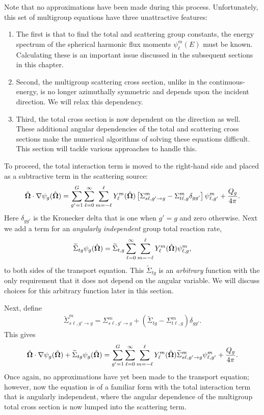 Note that no approximations have been made during this process. Unfortunately, this set of multigroup equations have three unattractive features: 
\begin{enumerate}
  \item The first is that to find the total and scattering group constants, the energy spectrum of the spherical harmonic flux moments $\psi_\ell^m(E)$ must be known. Calculating these is an important issue discussed in the subsequent sections in this chapter.
  \item Second, the multigroup scattering cross section, unlike in the continuous-energy, is no longer azimuthally symmetric and depends upon the incident direction. We will relax this dependency.
  \item Third, the total cross section is now dependent on the direction as well. These additional angular dependencies of the total and scattering cross sections make the numerical algorithms of solving these equations difficult. This section will tackle various approaches to handle this.
\end{enumerate}
To proceed, the total interaction term is moved to the right-hand side and placed as a subtractive term in the scattering source:
\begin{align}
  \hat{\mathbf{\Omega}} \cdot \nabla \psi_g(\hat{\mathbf{\Omega}}) = \sum_{g'=1}^G \sum_{\ell=0}^\infty \sum_{m=-\ell}^\ell Y_\ell^m(\hat{\mathbf{\Omega}}) \left[ \Sigma_{s\ell,g'\rightarrow g}^m   - \Sigma_{t\ell,g}^m \delta_{gg'} \right] \psi_{\ell,g'}^m + \frac{Q_g}{4\pi}.
\end{align}
Here $\delta_{gg'}$ is the Kronecker delta that is one when $g' = g$ and zero otherwise. Next we add a term for an \emph{angularly independent} group total reaction rate,
\begin{align}
  \widetilde{\Sigma}_{tg} \psi_g(\hat{\mathbf{\Omega}}) = \widetilde{\Sigma}_{t,g} \sum_{\ell=0}^\infty \sum_{m=-\ell}^\ell Y_\ell^m(\hat{\mathbf{\Omega}}) \psi_{\ell,g}^m ,
\end{align}
to both sides of the transport equation. This $\widetilde{\Sigma}_{tg}$ is an \emph{arbitrary} function with the only requirement that it does not depend on the angular variable. We will discuss choices for this arbitrary function later in this section.

Next, define
\begin{align} \label{Eq:Neutronics_ModifiedGroupToGroupScatteringXS}
  \widetilde{\Sigma}_{s\ell,g' \rightarrow g}^m = \Sigma_{s\ell,g'\rightarrow g}^m + ( \widetilde{\Sigma}_{tg} - \Sigma_{t\ell,g}^m ) \delta_{gg'} .
\end{align}
This gives
\begin{align}
  \hat{\mathbf{\Omega}} \cdot \nabla \psi_g(\hat{\mathbf{\Omega}}) + \widetilde{\Sigma}_{tg} \psi_g(\hat{\mathbf{\Omega}}) = \sum_{g'=1}^G \sum_{\ell=0}^\infty \sum_{m=-\ell}^\ell Y_\ell^m(\hat{\mathbf{\Omega}}) \widetilde{\Sigma}_{s\ell,g' \rightarrow g}^m \psi_{\ell,g'}^m + \frac{Q_g}{4\pi}.
\end{align}
Once again, no approximations have yet been made to the transport equation; however, now the equation is of a familiar form with the total interaction term that is angularly independent, where the angular dependence of the multigroup total cross section is now lumped into the scattering term. 

